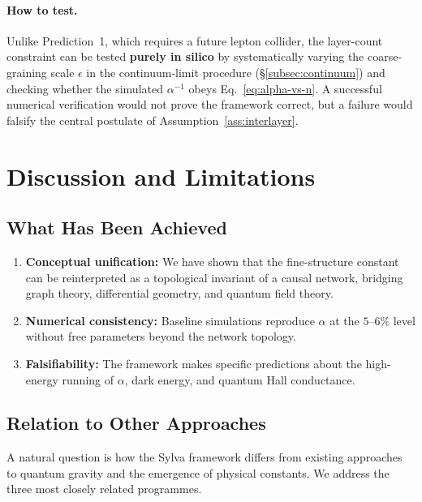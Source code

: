 \documentclass[11pt,a4paper]{article}
\theoremstyle{definition}
\theoremstyle{remark}
\begin{document}
\paragraph{How to test.}  Unlike Prediction~1, which requires a future
lepton collider, the layer-count constraint can be tested \textbf{purely in
silico} by systematically varying the coarse-graining scale $\epsilon$ in
the continuum-limit procedure (\S\ref{subsec:continuum}) and checking whether
the simulated $\alpha^{-1}$ obeys Eq.~\eqref{eq:alpha-vs-n}.  A successful
numerical verification would not prove the framework correct, but a failure
would falsify the central postulate of Assumption~\ref{ass:interlayer}.

\section{Discussion and Limitations}\label{sec:discussion}

\subsection{What Has Been Achieved}\label{subsec:achieved}

\begin{enumerate}[noitemsep]
\item \textbf{Conceptual unification:} We have shown that the fine-structure
constant can be reinterpreted as a topological invariant of a causal network,
bridging graph theory, differential geometry, and quantum field theory.
\item \textbf{Numerical consistency:} Baseline simulations reproduce $\alpha$ at
the $5\text{--}6\%$ level without free parameters beyond the network topology.
\item \textbf{Falsifiability:} The framework makes specific predictions about the
high-energy running of $\alpha$, dark energy, and quantum Hall conductance.
\end{enumerate}

\subsection{Relation to Other Approaches}\label{subsec:relation-to-others}

A natural question is how the Sylva framework differs from existing approaches to
quantum gravity and the emergence of physical constants.  We address the three
most closely related programmes.
\end{document}
